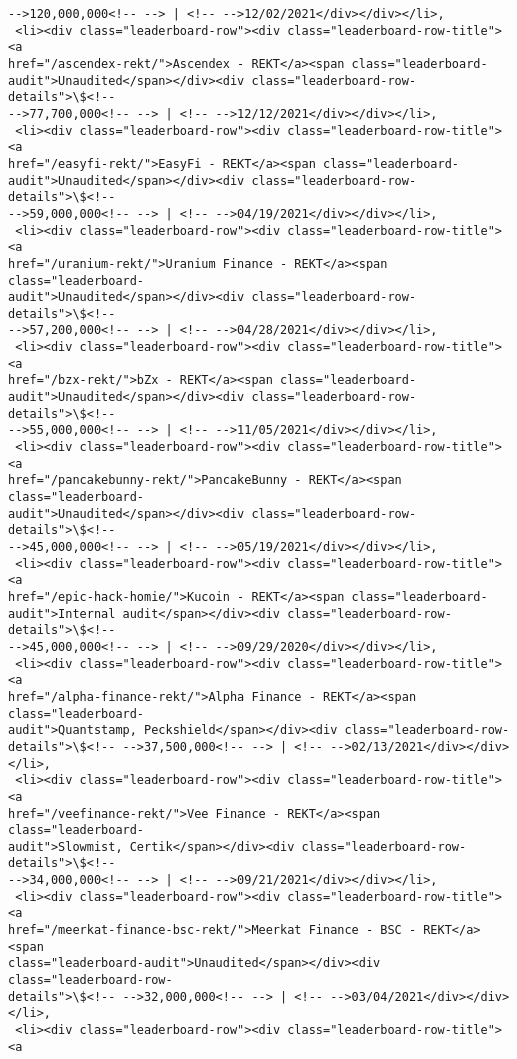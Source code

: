 \documentclass[11pt]{article}
\begin{document}
\begin{tcolorbox}[breakable, size=fbox, boxrule=.5pt, pad at break*=1mm, opacityfill=0]
\begin{Verbatim}[commandchars=\\\{\}]
-->120,000,000<!-- --> | <!-- -->12/02/2021</div></div></li>,
 <li><div class="leaderboard-row"><div class="leaderboard-row-title"><a
href="/ascendex-rekt/">Ascendex - REKT</a><span class="leaderboard-
audit">Unaudited</span></div><div class="leaderboard-row-details">\$<!--
-->77,700,000<!-- --> | <!-- -->12/12/2021</div></div></li>,
 <li><div class="leaderboard-row"><div class="leaderboard-row-title"><a
href="/easyfi-rekt/">EasyFi - REKT</a><span class="leaderboard-
audit">Unaudited</span></div><div class="leaderboard-row-details">\$<!--
-->59,000,000<!-- --> | <!-- -->04/19/2021</div></div></li>,
 <li><div class="leaderboard-row"><div class="leaderboard-row-title"><a
href="/uranium-rekt/">Uranium Finance - REKT</a><span class="leaderboard-
audit">Unaudited</span></div><div class="leaderboard-row-details">\$<!--
-->57,200,000<!-- --> | <!-- -->04/28/2021</div></div></li>,
 <li><div class="leaderboard-row"><div class="leaderboard-row-title"><a
href="/bzx-rekt/">bZx - REKT</a><span class="leaderboard-
audit">Unaudited</span></div><div class="leaderboard-row-details">\$<!--
-->55,000,000<!-- --> | <!-- -->11/05/2021</div></div></li>,
 <li><div class="leaderboard-row"><div class="leaderboard-row-title"><a
href="/pancakebunny-rekt/">PancakeBunny - REKT</a><span class="leaderboard-
audit">Unaudited</span></div><div class="leaderboard-row-details">\$<!--
-->45,000,000<!-- --> | <!-- -->05/19/2021</div></div></li>,
 <li><div class="leaderboard-row"><div class="leaderboard-row-title"><a
href="/epic-hack-homie/">Kucoin - REKT</a><span class="leaderboard-
audit">Internal audit</span></div><div class="leaderboard-row-details">\$<!--
-->45,000,000<!-- --> | <!-- -->09/29/2020</div></div></li>,
 <li><div class="leaderboard-row"><div class="leaderboard-row-title"><a
href="/alpha-finance-rekt/">Alpha Finance - REKT</a><span class="leaderboard-
audit">Quantstamp, Peckshield</span></div><div class="leaderboard-row-
details">\$<!-- -->37,500,000<!-- --> | <!-- -->02/13/2021</div></div></li>,
 <li><div class="leaderboard-row"><div class="leaderboard-row-title"><a
href="/veefinance-rekt/">Vee Finance - REKT</a><span class="leaderboard-
audit">Slowmist, Certik</span></div><div class="leaderboard-row-details">\$<!--
-->34,000,000<!-- --> | <!-- -->09/21/2021</div></div></li>,
 <li><div class="leaderboard-row"><div class="leaderboard-row-title"><a
href="/meerkat-finance-bsc-rekt/">Meerkat Finance - BSC - REKT</a><span
class="leaderboard-audit">Unaudited</span></div><div class="leaderboard-row-
details">\$<!-- -->32,000,000<!-- --> | <!-- -->03/04/2021</div></div></li>,
 <li><div class="leaderboard-row"><div class="leaderboard-row-title"><a

\end{Verbatim}
\end{tcolorbox}
\end{document}
